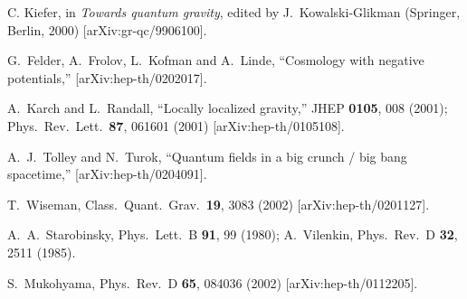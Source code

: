 \documentclass[a4paper,preprint,nofootinbib,
                 showpacs,preprintnumbers,amsmath,amssymb]{revtex4}
\begin{document}
\begin{thebibliography}{99}
C. Kiefer, in {\em Towards quantum gravity}, edited by 
J.~Kowalski-Glikman (Springer, Berlin, 2000) [arXiv:gr-qc/9906100]. 
 
G.~Felder, A.~Frolov, L.~Kofman and A.~Linde, 
``Cosmology with negative potentials,'' 
[arXiv:hep-th/0202017]. 
 
A.~Karch and L.~Randall,  
``Locally localized gravity,'' JHEP {\bf 0105}, 008 (2001); 
Phys.\ Rev.\ Lett.\ {\bf 87}, 061601 (2001) [arXiv:hep-th/0105108]. 
 
A.~J.~Tolley and N.~Turok, 
``Quantum fields in a big crunch / big bang spacetime,'' 
[arXiv:hep-th/0204091]. 
 
T.~Wiseman, 
Class.\ Quant.\ Grav.\  {\bf 19}, 3083 (2002) 
[arXiv:hep-th/0201127]. 
 
A.~A.~Starobinsky, 
Phys.\ Lett.\ B {\bf 91}, 99 (1980); 
A.~Vilenkin, 
Phys.\ Rev.\ D {\bf 32}, 2511 (1985). 
 
S.~Mukohyama, 
Phys.\ Rev.\ D {\bf 65}, 084036 (2002) 
[arXiv:hep-th/0112205]. 
\end{thebibliography} 
\end{document}
